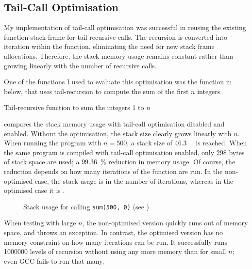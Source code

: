 \documentclass[00-main.tex]{subfiles}
\begin{document}
\subsection{Tail-Call Optimisation}

My implementation of tail-call optimisation was successful in reusing the existing function stack frame for tail-recursive calls. The recursion is converted into iteration within the function, eliminating the need for new stack frame allocations.
Therefore, the stack memory usage remains constant rather than growing linearly with the number of recursive calls.

One of the functions I used to evaluate this optimisation was the function in  below, that uses tail-recursion to compute the sum of the first $n$ integers.

\begin{listing}[ht]
  \caption{Tail-recursive function to sum the integers 1 to $n$}
  \label{lst:tail-recursive sum}
\end{listing}


 compares the stack memory usage with tail-call optimisation disabled and enabled.
Without the optimisation, the stack size clearly grows linearly with $n$.
When running the program with $n=500$, a stack size of \SI{46.3}{\kilo\byte} is reached.
When the same program is compiled with tail-call optimisation enabled, only 298 bytes of stack space are used; a \SI{99.36}{\percent} reduction in memory usage.
Of course, the reduction depends on how many iterations of the function are run.
In the non-optimised case, the stack usage is  in the number of iterations, whereas in the optimised case it is .

\begin{figure}[ht]
  \centering
  \caption{Stack usage for calling \texttt{sum(500, 0)} (see )}
  \label{fig:tail-call optimisation stack use}
\end{figure}

When testing with large $n$, the non-optimised version quickly runs out of memory space, and throws an exception.
In contrast, the optimised version has no memory constraint on how many iterations can be run.
It successfully runs \num{1000000} levels of recursion without using any more memory than for small $n$; even GCC fails to run that many.
\end{document}
